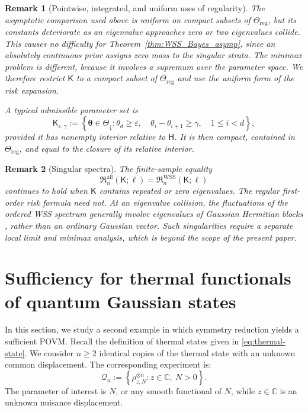 \documentclass{article}
\newtheorem{remark}{Remark}
\theoremstyle{named}
\theoremstyle{named1}
\newcommand{\WSS}{\mathrm{WSS}}
\newcommand{\btheta}{\boldsymbol{\theta}}
\newcommand{\bbC}{\mathbb C}
\newcommand{\cQ}{\mathcal Q}
\theoremstyle{plain}
\theoremstyle{remark}
\begin{document}
\begin{remark}[Pointwise, integrated, and uniform uses of regularity]

The asymptotic comparison used above is uniform on compact subsets of
$\Theta_{\mathrm{reg}}$, but its constants deteriorate as an eigenvalue
approaches zero or two eigenvalues collide. This causes no difficulty for
Theorem~\ref{thm:WSS_Bayes_asymp}, since an absolutely continuous prior
assigns zero mass to the singular strata. The minimax problem is different,
because it involves a supremum over the parameter space. We therefore
restrict $\mathsf K$ to a compact subset of $\Theta_{\mathrm{reg}}$ and use
the uniform form of the risk expansion.

A typical admissible parameter set is
\[
    \mathsf K_{\varepsilon,\gamma}
    :=\left\{
      \btheta\in\Theta_{\downarrow}:
      \theta_d\geq\varepsilon,\quad
      \theta_i-\theta_{i+1}\geq\gamma,
      \quad 1\leq i<d
    \right\},
\]
provided it has nonempty interior relative to \(\mathsf H\). It is
then compact, contained in \(\Theta_{\mathrm{reg}}\), and equal to the
closure of its relative interior.
\end{remark}

\begin{remark}[Singular spectra]
The finite-sample equality
\[
    \mathfrak R_n^{\mathrm{all}}(\mathsf K;\ell)
    =
    \mathfrak R_n^{\WSS}(\mathsf K;\ell)
\]
continues to hold when $\mathsf K$ contains repeated or zero eigenvalues.
The regular first-order risk formula need not. At an eigenvalue collision,
the fluctuations of the ordered WSS spectrum generally involve eigenvalues
of Gaussian Hermitian blocks \cite{Meliot12}, rather than an ordinary
Gaussian vector. Such singularities require a separate local limit and
minimax analysis, which is beyond the scope of the present paper.
\end{remark}




\section{Sufficiency for thermal functionals of quantum Gaussian states}
\label{sec:thermal}
In this section, we study a second example in which symmetry reduction
yields a sufficient POVM. Recall the definition of thermal states given in \eqref{eq:thermal-state}.
 We consider $n\geq 2$ identical copies of the thermal state with an unknown common displacement. The corresponding experiment is:
\begin{equation}
    \cQ_n
    :=
    \left\{
        \rho_{z,N}^{\otimes n}
        :
        z\in\bbC,\ N>0
    \right\}.
    \label{eq:ncopy-model}
\end{equation}
The parameter of interest is $N$, or any smooth functional of $N$, while
$z\in\bbC$
is an unknown nuisance displacement.
\end{document}
